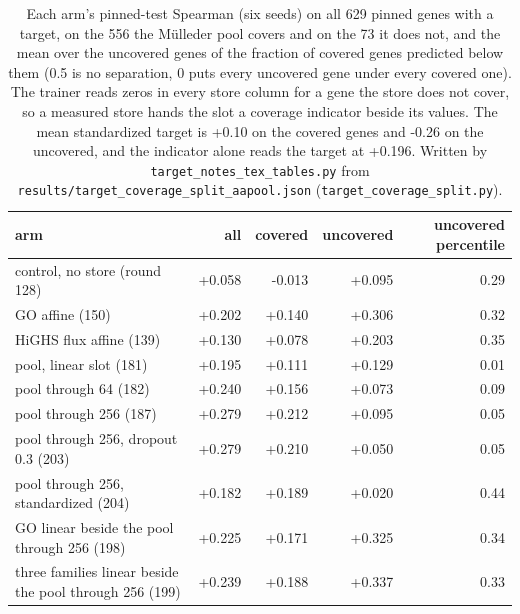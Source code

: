 \begin{table}[H]
  \centering
  \footnotesize
  \caption[The pinned read split by the pool's coverage]{Each arm's pinned-test Spearman (six seeds) on all 629 pinned genes with a target, on the 556 the M\"ulleder pool covers and on the 73 it does not, and the mean over the uncovered genes of the fraction of covered genes predicted below them (0.5 is no separation, 0 puts every uncovered gene under every covered one). The trainer reads zeros in every store column for a gene the store does not cover, so a measured store hands the slot a coverage indicator beside its values. The mean standardized target is +0.10 on the covered genes and -0.26 on the uncovered, and the indicator alone reads the target at +0.196. Written by \texttt{target\_notes\_tex\_tables.py} from \texttt{results/target\_coverage\_split\_aapool.json} (\texttt{target\_coverage\_split.py}).}
  \label{tab:coverage-split}
  \begin{tabular}{@{}lrrrr@{}}
    \hline
    arm & all & covered & uncovered & uncovered percentile \\
    \hline
    control, no store (round 128) & +0.058 & -0.013 & +0.095 & 0.29 \\
    GO affine (150) & +0.202 & +0.140 & +0.306 & 0.32 \\
    HiGHS flux affine (139) & +0.130 & +0.078 & +0.203 & 0.35 \\
    pool, linear slot (181) & +0.195 & +0.111 & +0.129 & 0.01 \\
    pool through 64 (182) & +0.240 & +0.156 & +0.073 & 0.09 \\
    pool through 256 (187) & +0.279 & +0.212 & +0.095 & 0.05 \\
    pool through 256, dropout 0.3 (203) & +0.279 & +0.210 & +0.050 & 0.05 \\
    pool through 256, standardized (204) & +0.182 & +0.189 & +0.020 & 0.44 \\
    GO linear beside the pool through 256 (198) & +0.225 & +0.171 & +0.325 & 0.34 \\
    three families linear beside the pool through 256 (199) & +0.239 & +0.188 & +0.337 & 0.33 \\
    \hline
  \end{tabular}
\end{table}
